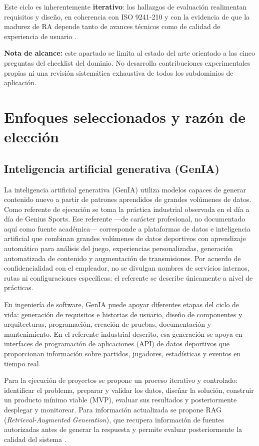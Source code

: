 \documentclass[conference]{IEEEtran}
\begin{document}
Este ciclo es inherentemente \textbf{iterativo}: los hallazgos de evaluación realimentan requisitos y diseño, en coherencia con ISO 9241-210 \cite{ISO9241210} y con la evidencia de que la madurez de RA depende tanto de avances técnicos como de calidad de experiencia de usuario \cite{Kim2018,Goh2023}.

\textbf{Nota de alcance:} este apartado se limita al estado del arte orientado a las cinco preguntas del checklist del dominio. No desarrolla contribuciones experimentales propias ni una revisión sistemática exhaustiva de todos los subdominios de aplicación.

\section{Enfoques seleccionados y razón de elección}

\subsection{Inteligencia artificial generativa (GenIA)}

La inteligencia artificial generativa (GenIA) utiliza modelos capaces de generar contenido nuevo a partir de patrones aprendidos de grandes volúmenes de datos. Como referente de ejecución se toma la práctica industrial observada en el día a día de Genius Sports. Ese referente —de carácter profesional, no documentado aquí como fuente académica— corresponde a plataformas de datos e inteligencia artificial que combinan grandes volúmenes de datos deportivos con aprendizaje automático para análisis del juego, experiencias personalizadas, generación automatizada de contenido y augmentación de transmisiones. Por acuerdo de confidencialidad con el empleador, no se divulgan nombres de servicios internos, rutas ni configuraciones específicas: el referente se describe únicamente a nivel de prácticas.

En ingeniería de software, GenIA puede apoyar diferentes etapas del ciclo de vida: generación de requisitos e historias de usuario, diseño de componentes y arquitecturas, programación, creación de pruebas, documentación y mantenimiento. En el referente industrial descrito, esa generación se apoya en interfaces de programación de aplicaciones (API) de datos deportivos que proporcionan información sobre partidos, jugadores, estadísticas y eventos en tiempo real.

Para la ejecución de proyectos se propone un proceso iterativo y controlado: identificar el problema, preparar y validar los datos, diseñar la solución, construir un producto mínimo viable (MVP), evaluar sus resultados y posteriormente desplegar y monitorear. Para información actualizada se propone RAG (\textit{Retrieval-Augmented Generation}), que recupera información de fuentes autorizadas antes de generar la respuesta y permite evaluar posteriormente la calidad del sistema \cite{Lewis2020}.
\end{document}
